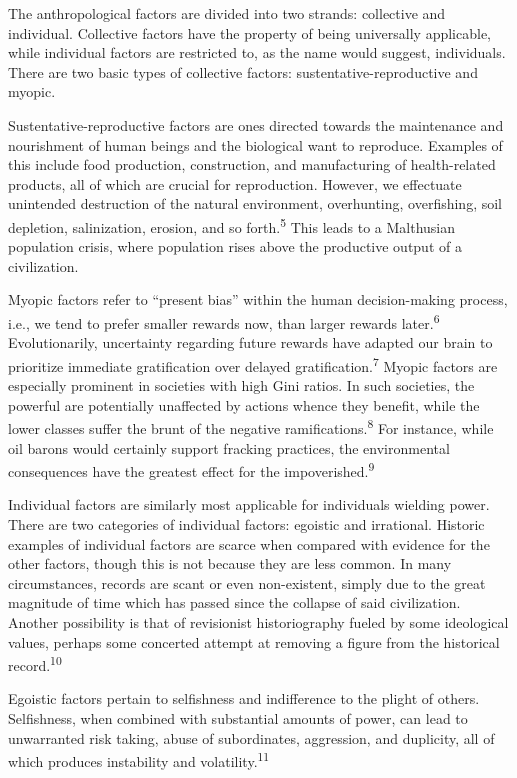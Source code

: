 \documentclass[12pt]{article}
\begin{document}
The anthropological factors are divided into two strands: collective and individual. Collective factors have the property of being universally applicable, while individual factors are restricted to, as the name would suggest, individuals. There are two basic types of collective factors: sustentative-reproductive and myopic.

Sustentative-reproductive factors are ones directed towards the maintenance and nourishment of human beings and the biological want to reproduce. Examples of this include food production, construction, and manufacturing of health-related products, all of which are crucial for reproduction. However, we effectuate unintended destruction of the natural environment, overhunting, overfishing, soil depletion, salinization, erosion, and so forth.\textsuperscript{5} This leads to a Malthusian population crisis, where population rises above the productive output of a civilization.

Myopic factors refer to ``present bias'' within the human decision-making process, i.e., we tend to prefer smaller rewards now, than larger rewards later.\textsuperscript{6} Evolutionarily, uncertainty regarding future rewards have adapted our brain to prioritize immediate gratification over delayed gratification.\textsuperscript{7} Myopic factors are especially prominent in societies with high Gini ratios. In such societies, the powerful are potentially unaffected by actions whence they benefit, while the lower classes suffer the brunt of the negative ramifications.\textsuperscript{8} For instance, while oil barons would certainly support fracking practices, the environmental consequences have the greatest effect for the impoverished.\textsuperscript{9}

Individual factors are similarly most applicable for individuals wielding power. There are two categories of individual factors: egoistic and irrational. Historic examples of individual factors are scarce when compared with evidence for the other factors, though this is not because they are less common. In many circumstances, records are scant or even non-existent, simply due to the great magnitude of time which has passed since the collapse of said civilization. Another possibility is that of revisionist historiography fueled by some ideological values, perhaps some concerted attempt at removing a figure from the historical record.\textsuperscript{10}

Egoistic factors pertain to selfishness and indifference to the plight of others. Selfishness, when combined with substantial amounts of power, can lead to unwarranted risk taking, abuse of subordinates, aggression, and duplicity, all of which produces instability and volatility.\textsuperscript{11}
\end{document}
